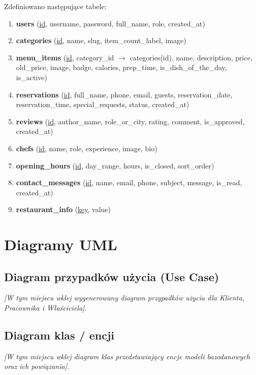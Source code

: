 \documentclass[12pt,a4paper]{article}
\begin{document}
Zdefiniowano następujące tabele:
\begin{enumerate}
    \item \textbf{users} (\underline{id}, username, password, full\_name, role, created\_at)
    \item \textbf{categories} (\underline{id}, name, slug, item\_count\_label, image)
    \item \textbf{menu\_items} (\underline{id}, category\_id $\rightarrow$ categories(id), name, description, price, old\_price, image, badge, calories, prep\_time, is\_dish\_of\_the\_day, is\_active)
    \item \textbf{reservations} (\underline{id}, full\_name, phone, email, guests, reservation\_date, reservation\_time, special\_requests, status, created\_at)
    \item \textbf{reviews} (\underline{id}, author\_name, role\_or\_city, rating, comment, is\_approved, created\_at)
    \item \textbf{chefs} (\underline{id}, name, role, experience, image, bio)
    \item \textbf{opening\_hours} (\underline{id}, day\_range, hours, is\_closed, sort\_order)
    \item \textbf{contact\_messages} (\underline{id}, name, email, phone, subject, message, is\_read, created\_at)
    \item \textbf{restaurant\_info} (\underline{key}, value)
\end{enumerate}

\section{Diagramy UML}

\subsection{Diagram przypadków użycia (Use Case)}
\textit{[W tym miejscu wklej wygenerowany diagram przypadków użycia dla Klienta, Pracownika i Właściciela]}.

\subsection{Diagram klas / encji}
\textit{[W tym miejscu wklej diagram klas przedstawiający encje modeli bazodanowych oraz ich powiązania]}.
\end{document}
